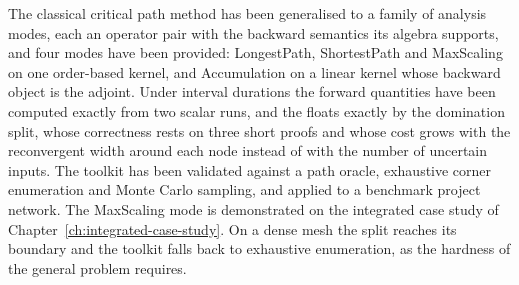 \documentclass[12pt]{report}
\begin{document}
The classical critical path method has been generalised to a family of analysis modes, each an operator pair with the
backward semantics its algebra supports, and four modes have been provided: LongestPath,
ShortestPath and MaxScaling on one order-based kernel, and Accumulation on a linear kernel
whose backward object is the adjoint. Under interval durations the forward quantities have
been computed exactly from two scalar runs, and the floats exactly by the domination split,
whose correctness rests on three short proofs and whose cost grows with the reconvergent
width around each node instead of with the number of uncertain inputs. The toolkit has been
validated against a path oracle, exhaustive corner enumeration and Monte Carlo sampling,
and applied to a benchmark project network. The MaxScaling mode is demonstrated on the
integrated case study of Chapter~\ref{ch:integrated-case-study}. On a dense mesh the split reaches its boundary and the toolkit falls back to exhaustive
enumeration, as the hardness of the general problem requires.

\ifdefined\maindoc
\else
\printbibliography
\end{document}
